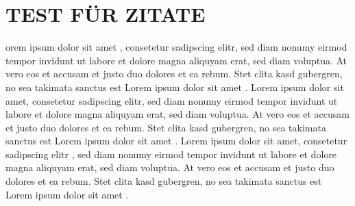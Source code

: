 \section{TEST FÜR ZITATE}
orem ipsum dolor sit amet \textcite{Schmitt2015}, consetetur sadipscing elitr, sed diam nonumy eirmod tempor invidunt ut labore et dolore magna aliquyam erat, sed diam voluptua. At vero eos et accusam et justo duo dolores et ea rebum. Stet clita kasd gubergren, no sea takimata sanctus est Lorem ipsum dolor sit amet \textcite{Baetge2007}. Lorem ipsum dolor sit amet, consetetur sadipscing elitr, sed diam nonumy eirmod tempor invidunt ut labore et dolore magna aliquyam erat, sed diam voluptua. At vero eos et accusam et justo duo dolores et ea rebum. Stet clita kasd gubergren, no sea takimata sanctus est Lorem ipsum dolor sit amet \textcite{Baetge2007}. Lorem ipsum dolor sit amet, consetetur sadipscing elitr \textcite{Nerdinger2009} \textcite{Nerdinger2007}, sed diam nonumy eirmod tempor invidunt ut labore et dolore magna aliquyam erat, sed diam voluptua. At vero eos et accusam et justo duo dolores et ea rebum. Stet clita kasd gubergren, no sea takimata sanctus est Lorem ipsum dolor sit amet \textcite{Diesner2008}. 
